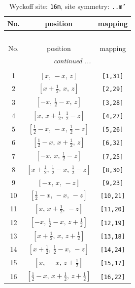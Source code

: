 \documentclass[fleqn,8pt]{jsarticle}
\begin{document}
\renewcommand{\arraystretch}{1.2}
\begin{longtable}{ccc}
\caption{Wyckoff site: {\tt 16m}, site symmetry: {\tt ..m'}}
 \\
 \hline \hline
No. & position & mapping \\ \hline \endfirsthead

\multicolumn{2}{l}{\tablename\ \thetable{}} \\
 \hline \hline
No. & position & mapping \\ \hline \endhead

 \hline \hline
\multicolumn{2}{r}{\footnotesize\it continued ...} \\ \endfoot

 \hline \hline
\multicolumn{2}{r}{} \\ \endlastfoot

1 & $\left[ x,\, - x,\, z \right]$ & {\tt [1,31]} \\ \hline
2 & $\left[ x + \frac{1}{2},\, x,\, z \right]$ & {\tt [2,29]} \\ \hline
3 & $\left[ - x,\, \frac{1}{2} - x,\, z \right]$ & {\tt [3,28]} \\ \hline
4 & $\left[ x,\, x + \frac{1}{2},\, \frac{1}{2} - z \right]$ & {\tt [4,27]} \\ \hline
5 & $\left[ \frac{1}{2} - x,\, - x,\, \frac{1}{2} - z \right]$ & {\tt [5,26]} \\ \hline
6 & $\left[ \frac{1}{2} - x,\, x + \frac{1}{2},\, z \right]$ & {\tt [6,32]} \\ \hline
7 & $\left[ - x,\, x,\, \frac{1}{2} - z \right]$ & {\tt [7,25]} \\ \hline
8 & $\left[ x + \frac{1}{2},\, \frac{1}{2} - x,\, \frac{1}{2} - z \right]$ & {\tt [8,30]} \\ \hline
9 & $\left[ - x,\, x,\, - z \right]$ & {\tt [9,23]} \\ \hline
10 & $\left[ \frac{1}{2} - x,\, - x,\, - z \right]$ & {\tt [10,21]} \\ \hline
11 & $\left[ x,\, x + \frac{1}{2},\, - z \right]$ & {\tt [11,20]} \\ \hline
12 & $\left[ - x,\, \frac{1}{2} - x,\, z + \frac{1}{2} \right]$ & {\tt [12,19]} \\ \hline
13 & $\left[ x + \frac{1}{2},\, x,\, z + \frac{1}{2} \right]$ & {\tt [13,18]} \\ \hline
14 & $\left[ x + \frac{1}{2},\, \frac{1}{2} - x,\, - z \right]$ & {\tt [14,24]} \\ \hline
15 & $\left[ x,\, - x,\, z + \frac{1}{2} \right]$ & {\tt [15,17]} \\ \hline
16 & $\left[ \frac{1}{2} - x,\, x + \frac{1}{2},\, z + \frac{1}{2} \right]$ & {\tt [16,22]} \\
\end{longtable}
\end{document}
